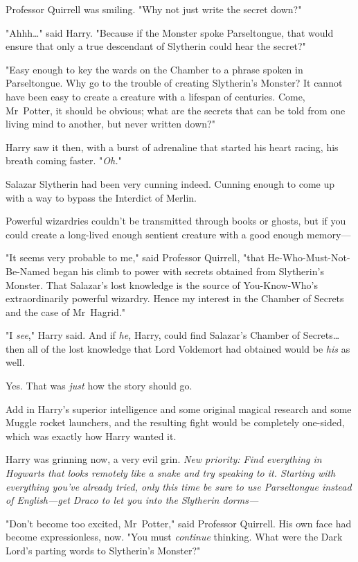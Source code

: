 Professor Quirrell was smiling. "Why not just write the secret down?"

"Ahhh…" said Harry. "Because if the Monster spoke Parseltongue, that
would ensure that only a true descendant of Slytherin could hear the secret?"

"Easy enough to key the wards on the Chamber to a phrase spoken in
Parseltongue. Why go to the trouble of creating Slytherin's Monster? It cannot
have been easy to create a creature with a lifespan of centuries. Come,
Mr~Potter, it should be obvious; what are the secrets that can be told from
one living mind to another, but never written down?"

Harry saw it then, with a burst of adrenaline that started his heart racing,
his breath coming faster. "\emph{Oh.}"

Salazar Slytherin had been very cunning indeed. Cunning enough to come up with
a way to bypass the Interdict of Merlin.

Powerful wizardries couldn't be transmitted through books or ghosts, but if you
could create a long-lived enough sentient creature with a good enough memory—

"It seems very probable to me," said Professor Quirrell, "that
He-Who-Must-Not-Be-Named began his climb to power with secrets obtained from
Slytherin's Monster. That Salazar's lost knowledge is the source of
You-Know-Who's extraordinarily powerful wizardry. Hence my interest in the
Chamber of Secrets and the case of Mr~Hagrid."

"I \emph{see}," Harry said. And if \emph{he,} Harry, could find Salazar's
Chamber of Secrets…then all of the lost knowledge that Lord Voldemort
had obtained would be \emph{his} as well.

Yes. That was \emph{just} how the story should go.

Add in Harry's superior intelligence and some original magical research and
some Muggle rocket launchers, and the resulting fight would be completely
one-sided, which was exactly how Harry wanted it.

Harry was grinning now, a very evil grin. \emph{New priority: Find everything
in Hogwarts that looks remotely like a snake and try speaking to it. Starting
with everything you've already tried, only this time be sure to use
Parseltongue instead of English—get Draco to let you into the Slytherin
dorms—}

"Don't become too excited, Mr~Potter," said Professor Quirrell. His own face
had become expressionless, now. "You must \emph{continue} thinking. What were
the Dark Lord's parting words to Slytherin's Monster?"

